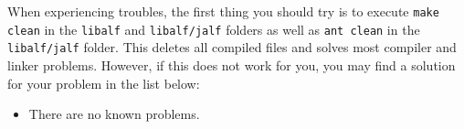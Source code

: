 \documentclass[a4paper, fontsize=11pt, DIV=12, parskip=half]{scrartcl}
\begin{document}
When experiencing troubles, the first thing you should try is to execute \texttt{make clean} in the \texttt{libalf} and \texttt{libalf/jalf} folders as well as \texttt{ant clean} in the \texttt{libalf/jalf} folder. This deletes all compiled files and solves most compiler and linker problems. However, if this does not work for you, you may find a solution for your problem in the list below:

\begin{itemize}
  \item There are no known problems.
\end{itemize}
\end{document}
